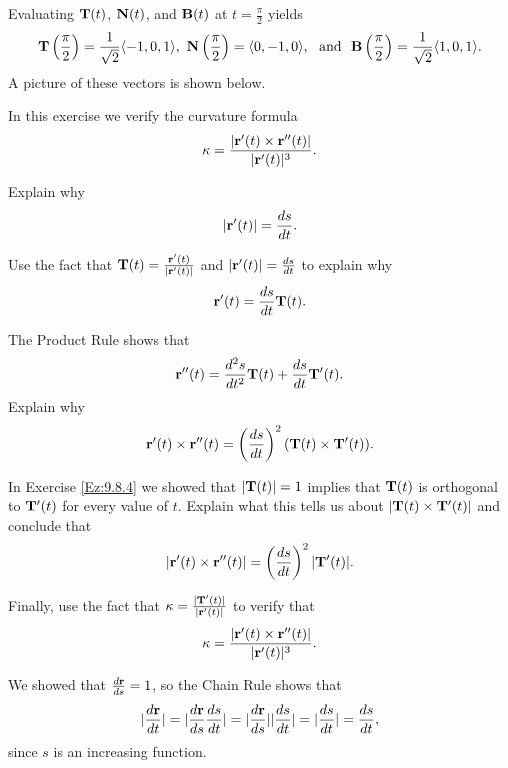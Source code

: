 \begin{exercises}
\begin{exerciseSolution}
	    \item Evaluating $\mathbf{T}(t)$, $\mathbf{N}(t)$, and $\mathbf{B}(t)$ at $t = \frac{\pi}{2}$ yields
	    \[\vT \left(\frac{\pi}{2}\right) = \frac{1}{\sqrt{2}}\langle -1,0,1 \rangle, \  \vN \left(\frac{\pi}{2}\right) = \langle 0,-1,0 \rangle, \ \text{ and } \ \vB \left(\frac{\pi}{2}\right) = \frac{1}{\sqrt{2}}\langle 1,0,1 \rangle.\]
A picture of these vectors is shown below.
\begin{center}
\end{center}

	\ea
\end{exerciseSolution}



\item \label{Ez:9.8.5} In this exercise we verify the curvature formula 
\[\kappa = \frac{\lvert \mathbf{r}'(t) \times \mathbf{r}''(t) \rvert}{\lvert \mathbf{r}'(t) \rvert^3}.\]
	\ba
	\item Explain why 
\[\lvert \mathbf{r}'(t) \rvert = \frac{ds}{dt}.\]

	\item Use the fact that $\mathbf{T}(t) = \frac{\mathbf{r}'(t)}{\lvert \mathbf{r}'(t) \rvert}$ and $\lvert \mathbf{r}'(t) \rvert = \frac{ds}{dt}$ to explain why 
	\[\mathbf{r}'(t) = \frac{ds}{dt} \mathbf{T}(t).\]

	\item The Product Rule shows that 
	\[\mathbf{r}''(t) = \frac{d^2s}{dt^2} \mathbf{T}(t) + \frac{ds}{dt} \mathbf{T}'(t).\]
	Explain why 
	\[\mathbf{r}'(t) \times \mathbf{r}''(t) = \left(\frac{ds}{dt}\right)^2 (\mathbf{T}(t) \times \mathbf{T}'(t)).\]
	
	\item In Exercise \ref{Ez:9.8.4} we showed that $\lvert \mathbf{T}(t) \rvert = 1$ implies that $\mathbf{T}(t)$ is orthogonal to $\mathbf{T}'(t)$ for every value of $t$. Explain what this tells us about $\lvert \mathbf{T}(t) \times \mathbf{T}'(t) \rvert$ and conclude that 
	\[\lvert \mathbf{r}'(t) \times \mathbf{r}''(t) \rvert = \left(\frac{ds}{dt}\right)^2 \lvert \mathbf{T}'(t) \rvert.\]
	
	\item Finally, use the fact that $\kappa = \frac{\lvert \mathbf{T}'(t) \rvert }{\lvert \mathbf{r}'(t) \rvert}$ to verify that 
 \[\kappa = \frac{\lvert \mathbf{r}'(t) \times \mathbf{r}''(t) \rvert}{\lvert \mathbf{r}'(t) \rvert^3}.\]
 
	\ea
	
\begin{exerciseSolution}
	\ba
	\item We showed that $\frac{d \mathbf{r}}{ds} = 1$, so the Chain Rule shows that 
\[\lvert \frac{d \mathbf{r}}{dt} \rvert = \lvert \frac{d \mathbf{r}}{ds} \frac{ds}{dt} \rvert = \lvert \frac{d \mathbf{r}}{ds} \rvert \lvert \frac{ds}{dt} \rvert = \lvert \frac{ds}{dt} \rvert = \frac{ds}{dt},\]
since $s$ is an increasing function. 


\end{exerciseSolution}
\end{exercises}
